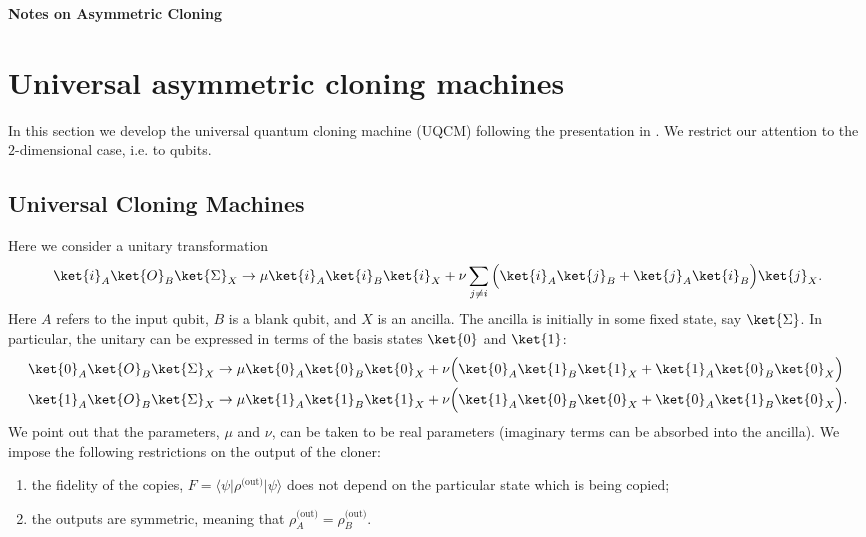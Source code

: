 \documentclass[reqno]{amsart}
\numberwithin{lemma}{section}
\numberwithin{proposition}{section}
\begin{document}
\begin{center}
    \textbf{Notes on Asymmetric Cloning}
\end{center}

\section{Universal asymmetric cloning machines}

In this section we develop the universal quantum cloning machine (UQCM) following the presentation in \cite{REZAKHANI2005278}. We restrict our attention to the $2$-dimensional case, i.e. to qubits.

\subsection{Universal Cloning Machines}
Here we consider a unitary transformation
\begin{equation*}
    \ket{i}_{A} \ket{O}_{B} \ket{\Sigma}_{X} \to \mu \ket{i}_{A} \ket{i}_{B} \ket{i}_{X} + \nu \sum_{j \neq i} \Big ( \ket{i}_{A} \ket{j}_{B} + \ket{j}_{A} \ket{i}_{B} \Big ) \ket{j}_{X}.
\end{equation*}
Here $A$ refers to the input qubit, $B$ is a blank qubit, and $X$ is an ancilla. The ancilla is initially in some fixed state, say $\ket{\Sigma}$. In particular, the unitary can be expressed in terms of the basis states $\ket{0}$ and $\ket{1}$:
\begin{align*}
    \ket{0}_{A} \ket{O}_{B} \ket{\Sigma}_{X} &\to \mu \ket{0}_{A} \ket{0}_{B} \ket{0}_{X} + \nu \Big ( \ket{0}_{A} \ket{1}_{B} \ket{1}_{X} + \ket{1}_{A} \ket{0}_{B} \ket{0}_{X} \Big )\\
    \ket{1}_{A} \ket{O}_{B} \ket{\Sigma}_{X} &\to \mu \ket{1}_{A} \ket{1}_{B} \ket{1}_{X} + \nu \Big ( \ket{1}_{A} \ket{0}_{B} \ket{0}_{X} + \ket{0}_{A} \ket{1}_{B} \ket{0}_{X} \Big ).
\end{align*}
We point out that the parameters, $\mu$ and $\nu$, can be taken to be real parameters (imaginary terms can be absorbed into the ancilla). We impose the following restrictions on the output of the cloner:
\begin{enumerate}
    \item the fidelity of the copies, $F = \langle \psi \vert \rho^{\text{(out)}} \vert \psi \rangle$ does not depend on the particular state which is being copied;
    \item the outputs are symmetric, meaning that $\rho_{A}^{\text{(out)}} = \rho_{B}^{\text{(out)}}$.
\end{enumerate}
\end{document}

